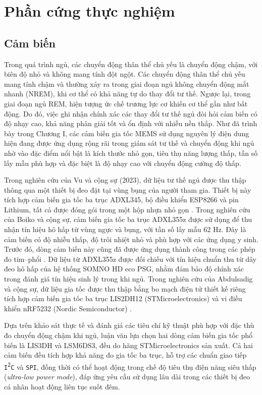 
\section{Phần cứng thực nghiệm \label{section_overview_propsed_method}}
\subsection{Cảm biến \label{section_overview_propsed_method}}

Trong quá trình ngủ, các chuyển động thân thể chủ yếu là chuyển động 
chậm, với biên độ nhỏ và không mang tính đột ngột. 
Các chuyển động thân thể chủ yếu mang tính chậm và thường xảy ra 
trong giai đoạn ngủ không chuyển động mắt nhanh (NREM), 
khi cơ thể có khả năng tự do thay đổi tư thế. Ngược lại, 
trong giai đoạn ngủ REM, hiện tượng ức chế trương lực cơ khiến 
cơ thể gần như bất động.
Do đó, việc ghi 
nhận chính xác các thay đổi tư thế ngủ đòi hỏi cảm biến có độ nhạy cao, 
khả năng phân giải tốt và ổn định với nhiễu nền thấp. Như đã trình bày 
trong Chương I, các cảm biến gia tốc MEMS sử dụng nguyên lý điện dung 
hiện đang được ứng dụng rộng rãi trong giám sát tư thế và chuyển động 
khi ngủ nhờ vào đặc điểm nổi bật là kích thước nhỏ gọn, tiêu thụ năng 
lượng thấp, tần số lấy mẫu phù hợp và đặc biệt là độ nhạy cao với 
chuyển động cường độ thấp.

Trong nghiên cứu của Vu và cộng sự (2023), dữ liệu tư thế ngủ được thu 
thập thông qua một thiết bị đeo đặt tại vùng bụng của người tham gia. 
Thiết bị này tích hợp cảm biến gia tốc ba trục ADXL345, 
bộ điều khiển ESP8266 và pin Lithium, tất cả được đóng gói trong 
một hộp nhựa nhỏ gọn \cite{vu2023}. Trong nghiên cứu của Boiko 
và cộng sự, cảm biến gia tốc ba trục ADXL355z 
được sử dụng để thu nhận tín hiệu hô hấp từ vùng ngực và bụng, 
với tần số lấy mẫu 62 Hz. Đây là cảm biến có độ nhiễu thấp, 
độ trôi nhiệt nhỏ và phù hợp với các ứng dụng y sinh. Trước đó, 
dòng cảm biến này cũng đã được ứng dụng thành công trong các phép 
đo tim–phổi \cite{Boiko2023}. Dữ liệu từ ADXL355z được đối chiếu với tín hiệu chuẩn 
thu từ dây đeo hô hấp của hệ thống SOMNO HD eco PSG, nhằm đảm bảo 
độ chính xác trong đánh giá tín hiệu sinh lý trong khi ngủ.
Trong nghiên cứu của Abdulsadig và cộng sự, dữ liệu gia tốc được 
thu thập bằng bo mạch điện tử thiết kế riêng tích hợp cảm biến gia tốc 
ba trục LIS2DH12 (STMicroelectronics) và vi điều khiển nRF5232 
(Nordic Semiconductor) \cite{Sleep_Posture_Detection}.


Dựa trên khảo sát thực tế và đánh giá các tiêu chí kỹ thuật phù hợp 
với đặc thù đo chuyển động chậm khi ngủ, luận văn lựa chọn hai dòng 
cảm biến gia tốc phổ biến là LIS3DH và LSM6DS3, đều do hãng 
STMicroelectronics sản xuất. Cả hai cảm biến đều tích hợp khả năng đo gia tốc ba trục, 
hỗ trợ các chuẩn giao tiếp \texttt{I\textsuperscript{2}C} và \texttt{SPI}, 
đồng thời có thể hoạt động trong chế độ tiêu thụ điện năng siêu thấp (\textit{ultra-low power mode}), 
đáp ứng yêu cầu sử dụng lâu dài trong các thiết bị đeo cá nhân hoạt động liên 
tục suốt đêm.

